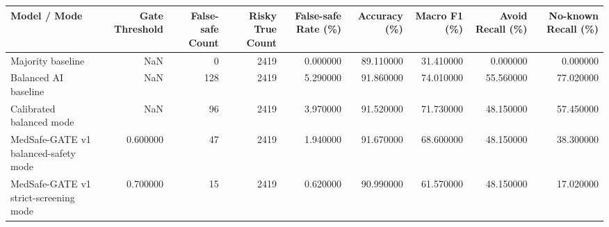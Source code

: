 \begin{tabular}{lrrrrrrrr}
\toprule
Model / Mode & Gate Threshold & False-safe Count & Risky True Count & False-safe Rate (\%) & Accuracy (\%) & Macro F1 (\%) & Avoid Recall (\%) & No-known Recall (\%) \\
\midrule
Majority baseline & NaN & 0 & 2419 & 0.000000 & 89.110000 & 31.410000 & 0.000000 & 0.000000 \\
Balanced AI baseline & NaN & 128 & 2419 & 5.290000 & 91.860000 & 74.010000 & 55.560000 & 77.020000 \\
Calibrated balanced mode & NaN & 96 & 2419 & 3.970000 & 91.520000 & 71.730000 & 48.150000 & 57.450000 \\
MedSafe-GATE v1 balanced-safety mode & 0.600000 & 47 & 2419 & 1.940000 & 91.670000 & 68.600000 & 48.150000 & 38.300000 \\
MedSafe-GATE v1 strict-screening mode & 0.700000 & 15 & 2419 & 0.620000 & 90.990000 & 61.570000 & 48.150000 & 17.020000 \\
\bottomrule
\end{tabular}
